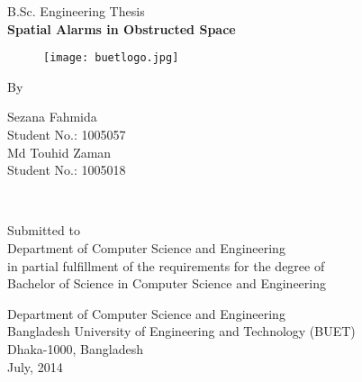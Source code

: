 \thispagestyle{empty}
\vspace{-5cm}
\begin{center}

\large{B.Sc. Engineering Thesis\\
\vspace{1cm}
\Large{{\textbf{Spatial Alarms in Obstructed Space}}}\\


\vspace{0.3cm}

  \vfill

\begin{figure}[!htbp]
\centering
\texttt{[image: buetlogo.jpg]}
\end{figure}

  \vfill

\vspace{0.3cm}

\normalsize{By}\\
\large{


Sezana Fahmida\\
Student No.: 1005057\\
Md Touhid Zaman\\
Student No.: 1005018}\\

}

\vspace{1.9cm}


\normalsize{Submitted to \\
Department of Computer Science and Engineering\\
in partial fulfillment of the requirements for the degree of\\
Bachelor of Science in Computer Science and Engineering}\\


\vspace{1.9cm}

\normalsize{Department of Computer Science and Engineering\\
Bangladesh University of Engineering and Technology (BUET) \\
Dhaka-1000, Bangladesh}\\
\vspace{0.4cm}
July, 2014

\end{center}

